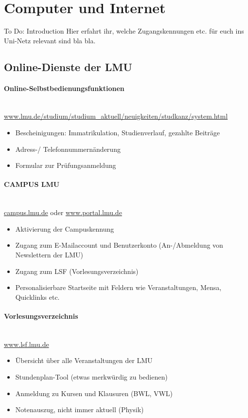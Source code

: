 ﻿\section{Computer und Internet}

To Do: Introduction
Hier erfahrt ihr, welche Zugangskennungen etc. für euch ins Uni-Netz relevant sind bla bla.

\subsection{Online-Dienste der LMU}

\paragraph{Online-Selbstbedienungsfunktionen}\hfill\\
\url{www.lmu.de/studium/studium_aktuell/neuigkeiten/studkanz/system.html}
\begin{itemize}
	\item Bescheinigungen: Immatrikulation, Studienverlauf, gezahlte Beiträge
	\item Adress-/ Telefonnummernänderung
	\item Formular zur Prüfungsanmeldung
\end{itemize}

\begin{urlList}
\end{urlList}


\paragraph{CAMPUS LMU}\hfill\\
\url{campus.lmu.de} oder \url{www.portal.lmu.de}
\begin{itemize}
	\item Aktivierung der Campuskennung
	\item Zugang zum E-Mailaccount und Benutzerkonto (An-/Abmeldung von Newslettern der LMU)
	\item Zugang zum LSF (Vorlesungsverzeichnis)
	\item Personalisierbare Startseite mit Feldern wie Veranstaltungen, Mensa, Quicklinks etc.
\end{itemize}

\paragraph{Vorlesungsverzeichnis}\hfill\\
\url{www.lsf.lmu.de}
\begin{itemize}
	\item Übersicht über alle Veranstaltungen der LMU
	\item Stundenplan-Tool (etwas merkwürdig zu bedienen)
	\item Anmeldung zu Kursen und Klausuren (BWL, VWL)
        \item Notenauszug, nicht immer aktuell (Physik)
\end{itemize}

